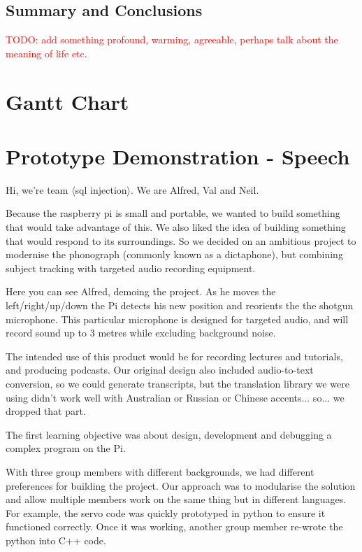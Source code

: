 \documentclass[11pt,a4paper,titlepage]{report}
\begin{document}
\section{Summary and Conclusions}

\textcolor{red}{TODO: add something profound, warming, agreeable, perhaps talk about the meaning of life etc.}


\begin{appendices}

\chapter{Gantt Chart}



\chapter{Prototype Demonstration - Speech}

\newpage

Hi, we're team $\langle$sql injection$\rangle$. We are Alfred, Val and Neil.

Because the raspberry pi is small and portable, we wanted to build something that would take advantage of this. We also liked the idea of building something that would respond to its surroundings. So we decided on an ambitious project to modernise the phonograph (commonly known as a dictaphone), but combining subject tracking with targeted audio recording equipment.

Here you can see Alfred, demoing the project. As he moves the left/right/up/down the Pi detects his new position and reorients the the shotgun microphone. This particular microphone is designed for targeted audio, and will record sound up to 3 metres while excluding background noise. 

The intended use of this product would be for recording lectures and tutorials, and producing podcasts. Our original design also included audio-to-text conversion, so we could generate transcripts, but the translation library we were using didn’t work well with Australian or Russian or Chinese accents... so... we dropped that part.

The first learning objective was about design, development and debugging a complex program on the Pi. 

With three group members with different backgrounds, we had different preferences for building the project. Our approach was to modularise the solution and allow multiple members work on the same thing but in different languages. For example, the servo code was quickly prototyped in python to ensure it functioned correctly. Once it was working, another group member re-wrote the python into C++ code. 


\end{appendices}
\end{document}
